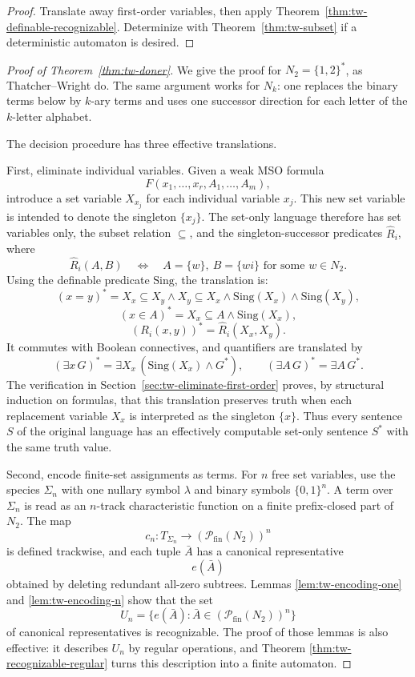 \documentclass[11pt]{article}
\theoremstyle{definition}
\newcommand{\TW}{Thatcher--Wright}
\newcommand{\powfin}{\mathcal P_{\mathrm{fin}}}
\newcommand{\Term}[1]{T_{#1}}
\begin{document}
\begin{proof}
Translate away first-order variables, then apply
Theorem~\ref{thm:tw-definable-recognizable}.  Determinize with
Theorem~\ref{thm:tw-subset} if a deterministic automaton is desired.
\end{proof}

\begin{proof}[Proof of Theorem~\ref{thm:tw-doner}]
We give the proof for \(N_2=\{1,2\}^*\), as \TW{} do.  The same argument works
for \(N_k\): one replaces the binary terms below by \(k\)-ary terms and uses one
successor direction for each letter of the \(k\)-letter alphabet.

The decision procedure has three effective translations.

First, eliminate individual variables.  Given a weak MSO formula
\[
  F(x_1,\ldots,x_r,A_1,\ldots,A_m),
\]
introduce a set variable \(X_{x_j}\) for each individual variable \(x_j\).  This
new set variable is intended to denote the singleton \(\{x_j\}\).  The
set-only language therefore has set variables only, the subset relation
\(\subseteq\), and the singleton-successor predicates \(\widehat R_i\), where
\[
  \widehat R_i(A,B)
  \quad\Longleftrightarrow\quad
  A=\{w\},\ B=\{wi\}
  \text{ for some }w\in N_2.
\]
Using the definable predicate \(\mathrm{Sing}\), the translation is:
\[
  (x=y)^*
  =
  X_x\subseteq X_y\wedge X_y\subseteq X_x
    \wedge \mathrm{Sing}(X_x)\wedge\mathrm{Sing}(X_y),
\]
\[
  (x\in A)^*
  =
  X_x\subseteq A\wedge \mathrm{Sing}(X_x),
\]
\[
  (R_i(x,y))^*
  =
  \widehat R_i(X_x,X_y).
\]
It commutes with Boolean connectives, and quantifiers are translated by
\[
  (\exists x\,G)^*
  =
  \exists X_x\,(\mathrm{Sing}(X_x)\wedge G^*),
  \qquad
  (\exists A\,G)^*
  =
  \exists A\,G^*.
\]
The verification in Section~\ref{sec:tw-eliminate-first-order} proves, by
structural induction on formulas, that this translation preserves truth when
each replacement variable \(X_x\) is interpreted as the singleton \(\{x\}\).
Thus every sentence \(S\) of the original language has an effectively computable
set-only sentence \(S^*\) with the same truth value.

Second, encode finite-set assignments as terms.  For \(n\) free set variables,
use the species \(\Sigma_n\) with one nullary symbol \(\lambda\) and binary
symbols \(\{0,1\}^n\).  A term over \(\Sigma_n\) is read as an \(n\)-track
characteristic function on a finite prefix-closed part of \(N_2\).  The map
\[
  c_n:\Term{\Sigma_n}\to(\powfin(N_2))^n
\]
is defined trackwise, and each tuple \(\bar A\) has a canonical representative
\[
  e(\bar A)
\]
obtained by deleting redundant all-zero subtrees.  Lemmas
\ref{lem:tw-encoding-one} and \ref{lem:tw-encoding-n} show that the set
\[
  U_n=\{e(\bar A):\bar A\in(\powfin(N_2))^n\}
\]
of canonical representatives is recognizable.  The proof of those lemmas is
also effective: it describes \(U_n\) by regular operations, and Theorem
\ref{thm:tw-recognizable-regular} turns this description into a finite
automaton.


\end{proof}
\end{document}
